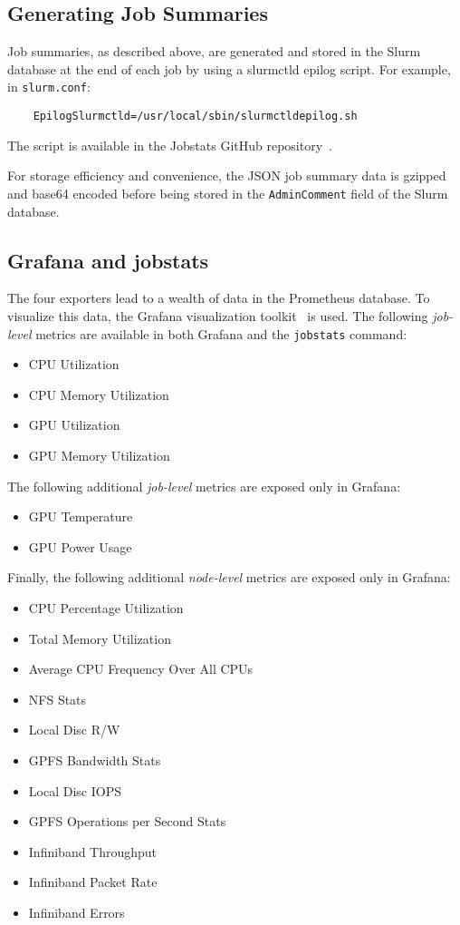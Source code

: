 \subsection{Generating Job Summaries}
Job summaries, as described above, are generated and stored in the Slurm database at the end of each job by using a slurmctld epilog script. For example, in \texttt{slurm.conf}:

\begin{verbatim}
    EpilogSlurmctld=/usr/local/sbin/slurmctldepilog.sh
\end{verbatim}

\noindent
The script is available in the Jobstats GitHub repository~\cite{gen_job_summary}.

For storage efficiency and convenience, the JSON job summary data is gzipped and base64 encoded before being stored in the \texttt{AdminComment} field of the Slurm database.


\subsection{Grafana and jobstats}
The four exporters lead to a wealth of data in the Prometheus database. To visualize this data, the Grafana visualization toolkit~\cite{grafana} is used. The following \emph{job-level} metrics are available in both Grafana and the \texttt{jobstats} command:

\begin{itemize}
\item CPU Utilization
\item CPU Memory Utilization
\item GPU Utilization
\item GPU Memory Utilization
\end{itemize}

\noindent
The following additional \emph{job-level} metrics are exposed only in Grafana:

\begin{itemize}
\item GPU Temperature
\item GPU Power Usage
\end{itemize}

\noindent
Finally, the following additional \emph{node-level} metrics are exposed only in Grafana:

\begin{itemize}
\item CPU Percentage Utilization
\item Total Memory Utilization
\item Average CPU Frequency Over All CPUs
\item NFS Stats
\item Local Disc R/W
\item GPFS Bandwidth Stats
\item Local Disc IOPS
\item GPFS Operations per Second Stats
\item Infiniband Throughput
\item Infiniband Packet Rate
\item Infiniband Errors
\end{itemize}

